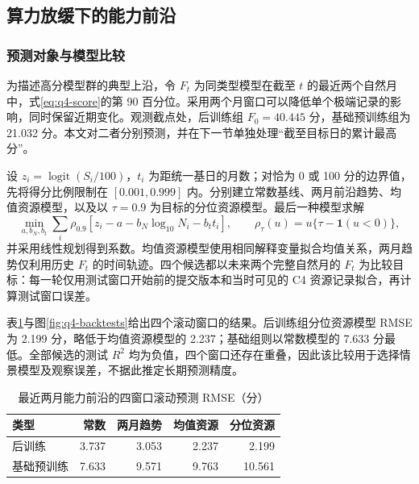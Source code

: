 \subsection{算力放缓下的能力前沿}

\subsubsection{预测对象与模型比较}

为描述高分模型群的典型上沿，令 $F_t$ 为同类型模型在截至 $t$ 的最近两个自然月中，式\eqref{eq:q4-score}的第 90 百分位。采用两个月窗口可以降低单个极端记录的影响，同时保留近期变化。观测截点处，后训练组 $F_0=40.445$ 分，基础预训练组为 21.032 分。本文对二者分别预测，并在下一节单独处理“截至目标日的累计最高分”。

设 $z_i=\operatorname{logit}(S_i/100)$\cite{islr2021}，$t_i$ 为距统一基日的月数；对恰为 0 或 100 分的边界值，先将得分比例限制在 $[0.001,0.999]$ 内。分别建立常数基线、两月前沿趋势、均值资源模型，以及以 $\tau=0.9$ 为目标的分位资源模型\cite{koenker2017}。最后一种模型求解
\begin{equation}
 \min_{a,b_N,b_t}\sum_i\rho_{0.9}
 \left[z_i-a-b_N\log_{10}N_i-b_tt_i\right],\qquad
 \rho_\tau(u)=u\{\tau-\mathbf1(u<0)\},
 \label{eq:q4-quantile-fit}
\end{equation}
并采用线性规划得到系数。均值资源模型使用相同解释变量拟合均值关系，两月趋势仅利用历史 $F_t$ 的时间轨迹。四个候选都以未来两个完整自然月的 $F_t$ 为比较目标：每一轮仅用测试窗口开始前的提交版本和当时可见的 C4 资源记录拟合，再计算测试窗口误差\cite{forecasting2021}。

表\ref{tab:q4-backtest}与图\ref{fig:q4-backtests}给出四个滚动窗口的结果。后训练组分位资源模型 RMSE 为 2.199 分，略低于均值资源模型的 2.237；基础组则以常数模型的 7.633 分最低。全部候选的测试 $R^2$ 均为负值，四个窗口还存在重叠，因此该比较用于选择情景模型及观察误差，不据此推定长期预测精度。

\begin{table}[htbp]
 \centering\small
 \caption{最近两月能力前沿的四窗口滚动预测 RMSE（分）}
 \label{tab:q4-backtest}
 \begin{tabular}{lrrrr}
 \toprule
 类型 & 常数 & 两月趋势 & 均值资源 & 分位资源\\
 \midrule
 后训练 & 3.737 & 3.053 & 2.237 & 2.199\\
 基础预训练 & 7.633 & 9.571 & 9.763 & 10.561\\
 \bottomrule
 \end{tabular}
\end{table}


